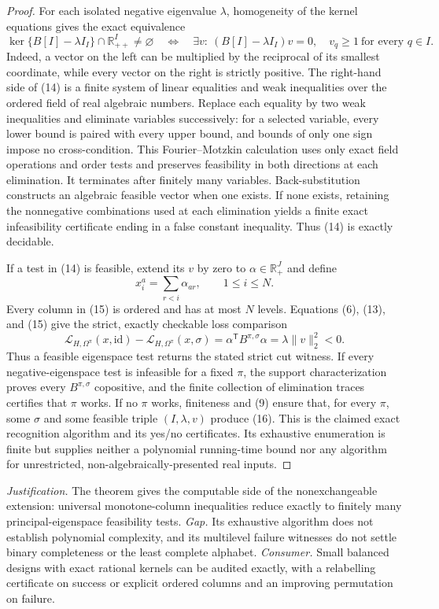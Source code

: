 \documentclass{article}
\begin{document}
\begin{proof}
For each isolated negative eigenvalue \(\lambda\), homogeneity of the kernel equations gives the exact equivalence
\[
 \ker\{B[I]-\lambda I_I\}\cap\mathbb R_{++}^I\neq\varnothing
 \quad\Longleftrightarrow\quad
 \exists v:\ (B[I]-\lambda I_I)v=0,
 \quad v_q\geq1\ \text{for every }q\in I. \tag{14}
\]
Indeed, a vector on the left can be multiplied by the reciprocal of its smallest coordinate, while every vector on the right is strictly positive.  The right-hand side of (14) is a finite system of linear equalities and weak inequalities over the ordered field of real algebraic numbers.  Replace each equality by two weak inequalities and eliminate variables successively: for a selected variable, every lower bound is paired with every upper bound, and bounds of only one sign impose no cross-condition.  This Fourier--Motzkin calculation uses only exact field operations and order tests and preserves feasibility in both directions at each elimination.  It terminates after finitely many variables.  Back-substitution constructs an algebraic feasible vector when one exists.  If none exists, retaining the nonnegative combinations used at each elimination yields a finite exact infeasibility certificate ending in a false constant inequality.  Thus (14) is exactly decidable.

If a test in (14) is feasible, extend its \(v\) by zero to \(\alpha\in\mathbb R_+^J\) and define
\[
 x_i^a=\sum_{r<i}\alpha_{ar},
 \qquad 1\leq i\leq N. \tag{15}
\]
Every column in (15) is ordered and has at most \(N\) levels.  Equations (6), (13), and (15) give the strict, exactly checkable loss comparison
\[
 \mathscr L_{H,\Omega^\pi}(x,\mathrm{id})
 -\mathscr L_{H,\Omega^\pi}(x,\sigma)
 =\alpha^{\mathsf T}B^{\pi,\sigma}\alpha
 =\lambda\lVert v\rVert_2^2<0. \tag{16}
\]
Thus a feasible eigenspace test returns the stated strict cut witness.  If every negative-eigenspace test is infeasible for a fixed \(\pi\), the support characterization proves every \(B^{\pi,\sigma}\) copositive, and the finite collection of elimination traces certifies that \(\pi\) works.  If no \(\pi\) works, finiteness and (9) ensure that, for every \(\pi\), some \(\sigma\) and some feasible triple \((I,\lambda,v)\) produce (16).  This is the claimed exact recognition algorithm and its yes/no certificates.  Its exhaustive enumeration is finite but supplies neither a polynomial running-time bound nor any algorithm for unrestricted, non-algebraically-presented real inputs.
\end{proof}
\par\smallskip\noindent \textit{Justification.} The theorem gives the computable side of the nonexchangeable extension: universal monotone-column inequalities reduce exactly to finitely many principal-eigenspace feasibility tests. \textit{Gap.} Its exhaustive algorithm does not establish polynomial complexity, and its multilevel failure witnesses do not settle binary completeness or the least complete alphabet. \textit{Consumer.} Small balanced designs with exact rational kernels can be audited exactly, with a relabelling certificate on success or explicit ordered columns and an improving permutation on failure.
\end{document}
